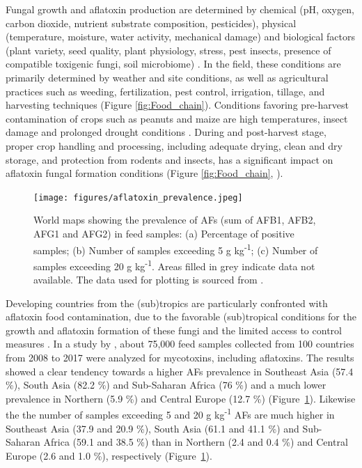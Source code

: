 Fungal growth and aflatoxin production are determined by chemical (pH, oxygen, carbon dioxide, nutrient substrate composition, pesticides), physical (temperature, moisture, water activity, mechanical damage) and biological factors (plant variety, seed quality, plant physiology, stress, pest insects, presence of compatible toxigenic fungi, soil microbiome) \citep{pleadin2019mycotoxins, bryden2012mycotoxin}. In the field, these conditions are primarily determined by weather and site conditions, as well as agricultural practices such as weeding, fertilization, pest control, irrigation, tillage, and harvesting techniques (Figure \ref{fig:Food_chain}). Conditions favoring pre-harvest contamination of crops such as peanuts and maize are high temperatures, insect damage and prolonged drought conditions \citep{bryden2012mycotoxin}. During and post-harvest stage, proper crop handling and processing, including adequate drying, clean and dry storage, and protection from rodents and insects, has a significant impact on aflatoxin fungal formation conditions (Figure \ref{fig:Food_chain}, \cite{kyei2021awareness}).

\begin{figure}[ht]
	\centering
	\texttt{[image: figures/aflatoxin\_prevalence.jpeg]}
	\decoRule
	\captionsetup{labelfont=bf, justification=justified, singlelinecheck=false, width=\textwidth}
	\caption{World maps showing the prevalence of AFs (sum of AFB1, AFB2, AFG1 and AFG2) in feed samples: (a) Percentage of positive samples; (b) Number of samples exceeding 5 \textmu{}g kg\textsuperscript{-1}; (c) Number of samples exceeding 20 \textmu{}g kg\textsuperscript{-1}. Areas filled in grey indicate data not available. The data used for plotting is sourced from \citet{gruber2019global}.}
	\label{fig:Aflatoxin_Prevalence}
\end{figure}
\afterpage{\FloatBarrier}

Developing countries from the (sub)tropics are particularly confronted with aflatoxin food contamination, due to the favorable (sub)tropical conditions for the growth and aflatoxin formation of these fungi and the limited access to control measures \citep{gbashi2018socio, nji2022six}. In a study by \citet{gruber2019global}, about 75,000 feed samples collected from 100 countries from 2008 to 2017 were analyzed for mycotoxins, including aflatoxins. The results showed a clear tendency towards a higher AFs prevalence in Southeast Asia (57.4 \%), South Asia (82.2 \%) and Sub-Saharan Africa (76 \%) and a much lower prevalence in Northern (5.9 \%) and Central Europe (12.7 \%) (Figure~\ref{fig:Aflatoxin_Prevalence}). Likewise the the number of samples exceeding 5 and 20  \textmu{}g kg\textsuperscript{-1} AFs are much higher in Southeast Asia (37.9 and 20.9 \%),  South Asia (61.1 and 41.1 \%) and Sub-Saharan Africa (59.1 and 38.5 \%) than in Northern (2.4 and 0.4 \%) and Central Europe (2.6 and 1.0 \%), respectively (Figure~\ref{fig:Aflatoxin_Prevalence}). 


